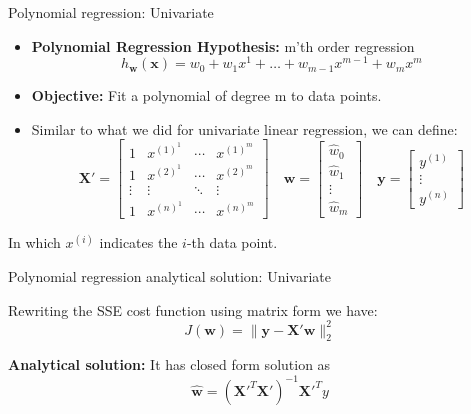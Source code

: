 \documentclass[serif, aspectratio=169]{beamer}
\begin{document}
\begin{frame}{Polynomial regression: Univariate}
    \begin{itemize}
        \item \textbf{Polynomial Regression Hypothesis:} m'th order regression
        \[
        h_{\mathbf{w}}(\mathbf{x}) = w_0 + w_1 x^1 + \dots + w_{m-1} x^{m-1} + w_m x^m
        \]
        \item \textbf{Objective:} Fit a polynomial of degree m to data points.
    \end{itemize}

    \begin{itemize}
        \item Similar to what we did for univariate linear regression, we can define:
        \[
        \mathbf{X'} =
        \begin{bmatrix}
        1 & x^{(1)^1} & \cdots & x^{(1)^m} \\
        1 & x^{(2)^1} & \cdots & x^{(2)^m} \\
        \vdots & \vdots & \ddots & \vdots \\
        1 & x^{(n)^1} & \cdots & x^{(n)^m}
        \end{bmatrix}
        \quad
        \mathbf{w} =
        \begin{bmatrix}
        \hat{w}_0 \\
        \hat{w}_1 \\
        \vdots \\
        \hat{w}_m
        \end{bmatrix}
        \quad
        \mathbf{y} =
        \begin{bmatrix}
        y^{(1)} \\
        \vdots \\
        y^{(n)}
        \end{bmatrix}
        \]
    \end{itemize}
    \begin{center}
        In which \( x^{(i)} \) indicates the \( i \)-th data point.
    \end{center}
\end{frame}

\begin{frame}{Polynomial regression analytical solution: Univariate}
    \item Rewriting the SSE cost function using matrix form we have:
    \[
    J(\mathbf{w}) = \| \mathbf{y} - \mathbf{X'} \mathbf{w} \|_2^2
    \]
    \item \textbf{Analytical solution:} It has closed form solution as $$ \hat{\mathbf{w}} = \left( \mathbf{X'}^T\mathbf{X'} \right)^{-1} \mathbf{X'}^T y $$
\end{frame}
\end{document}
